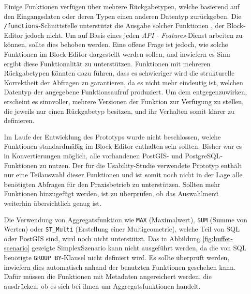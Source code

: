 \pskip
Einige Funktionen verfügen über mehrere Rückgabetypen, welche basierend auf den Eingangsdaten oder deren Typen einen anderen Datentyp zurückgeben. Die \texttt{/functions}-Schnittstelle unterstützt die Ausgabe solcher Funktionen , der Block-Editor jedoch nicht. Um auf Basis eines jeden \textit{API - Features}-Dienst arbeiten zu können, sollte dies behoben werden. Eine offene Frage ist jedoch, wie solche Funktionen im Block-Editor dargestellt werden sollen, und inwiefern es Sinn ergibt diese Funktionalität zu unterstützen. Funktionen mit mehreren Rückgabetypen könnten dazu führen, dass es schwieriger wird die strukturelle Korrektheit der Abfragen zu garantieren, da es nicht mehr eindeutig ist, welchen Datentyp der angegebene Funktionsaufruf produziert. Um dem entgegenzuwirken, erscheint es sinnvoller, mehrere Versionen der Funktion zur Verfügung zu stellen, die jeweils nur einen Rückgabetyp besitzen, und ihr Verhalten somit klarer zu definieren.

\pskip
Im Laufe der Entwicklung des Prototyps wurde nicht beschlossen, welche Funktionen standardmäßig im Block-Editor enthalten sein sollten. Bisher war es in Konvertierungen möglich, alle vorhandenen PostGIS- und PostgreSQL-Funktionen zu nutzen. Der für die Usability-Studie verwendete Prototyp enthält nur eine Teilauswahl dieser Funktionen und ist somit noch nicht in der Lage alle benötigten Abfragen für den Praxisbetrieb zu unterstützen. Sollten mehr Funktionen hinzugefügt werden, ist zu überprüfen, ob das Auswahlmenü weiterhin übersichtlich genug ist.

\pskip
Die Verwendung von Aggregatsfunktion wie \texttt{MAX} (Maximalwert), \texttt{SUM} (Summe von Werten) oder \texttt{ST\_Multi} (Erstellung einer Multigeometrie), welche Teil von \ac{SQL} oder PostGIS sind, wird noch nicht unterstützt. Das in Abbildung \ref{fig:buffet-scenario} gezeigte SimplexSzenario kann nicht ausgeführt werden, da die von \ac{SQL} benötigte \texttt{GROUP BY}-Klausel nicht definiert wird. Es sollte überprüft werden, inwiefern dies automatisch anhand der benutzten Funktionen geschehen kann. Dafür müssen die Funktionen mit Metadaten angereichert werden, die ausdrücken, ob es sich bei ihnen um Aggregatsfunktionen handelt.
